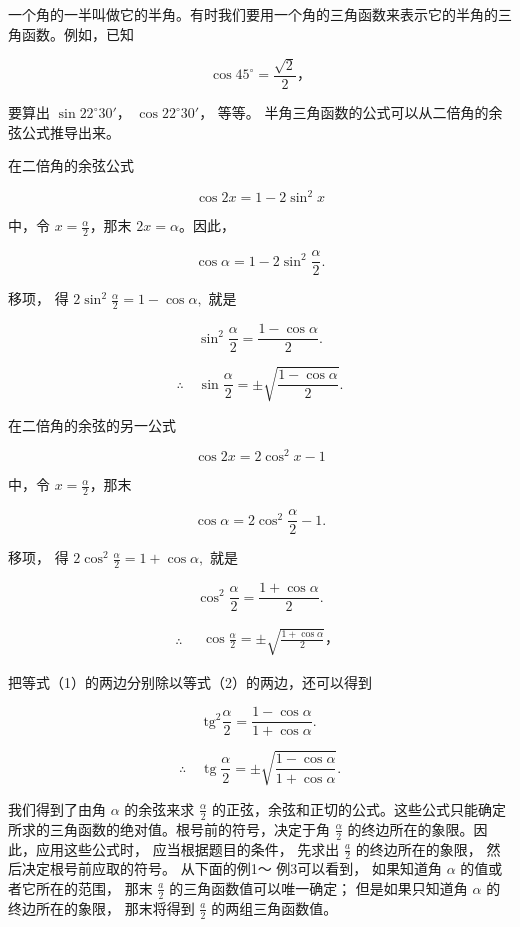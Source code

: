 一个角的一半叫做它的半角。有时我们要用一个角的三角函数来表示它的半角的三角函数。例如，已知

\[
\cos 45 ^{\circ} = \frac {\sqrt {2}}{2}\text{，}
\]

要算出 \(\sin 22^{\circ}30'\)， \(\cos 22^{\circ}30'\)， 等等。
半角三角函数的公式可以从二倍角的余弦公式推导出来。

在二倍角的余弦公式

\[
\cos 2 x = 1 - 2 \sin^ {2} x
\]

中，令 \(x = \frac{\alpha}{2}\)，那末 \(2x = \alpha\)。因此，

\[
\cos \alpha = 1 - 2 \sin^ {2} \frac {\alpha}{2}.
\]

移项， 得 \(2\sin^{2}\frac{\alpha}{2}=1-\cos\alpha,\) 就是

\[
\sin^ {2} \frac {\alpha}{2} = \frac {1 - \cos \alpha}{2}. \tag {1}
\]

\[
\therefore \quad \sin \frac {\alpha}{2} = \pm \sqrt {\frac {1 - \cos \alpha}{2}}.
\]

在二倍角的余弦的另一公式

\[
\cos 2 x = 2 \cos^ {2} x - 1
\]

中，令 \(x = \frac{\alpha}{2}\)，那末

\[
\cos \alpha = 2 \cos^ {2} \frac {\alpha}{2} - 1.
\]

移项， 得 \(2 \cos^{2} \frac{\alpha}{2} = 1 + \cos \alpha,\) 就是

\[
\cos^ {2} \frac {\alpha}{2} = \frac {1 + \cos \alpha}{2}. \tag {2}
\]

\[
\therefore \quad \boxed { \begin{array}{c} \cos \frac {\alpha}{2} = \pm \sqrt {\frac {1 + \cos \alpha}{2}}\text{，} \end{array} }
\]

把等式（1）的两边分别除以等式（2）的两边，还可以得到

\[
\mathrm{tg} ^ {2} \frac {\alpha}{2} = \frac {1 - \cos \alpha}{1 + \cos \alpha}.
\]

\[
\therefore \quad \operatorname{tg} \frac {\alpha}{2} = \pm \sqrt {\frac {1 - \cos \alpha}{1 + \cos \alpha}}.
\]

我们得到了由角 \(\alpha\) 的余弦来求 \(\frac{\alpha}{2}\)
的正弦，余弦和正切的公式。这些公式只能确定所求的三角函数的绝对值。根号前的符号，决定于角
\(\frac{\alpha}{2}\) 的终边所在的象限。因此，应用这些公式时，
应当根据题目的条件， 先求出 \(\frac{a}{2}\) 的终边所在的象限，
然后决定根号前应取的符号。 从下面的例1～ 例3可以看到，
如果知道角 \(\alpha\) 的值或者它所在的范围， 那末 \(\frac{a}{2}\)
的三角函数值可以唯一确定； 但是如果只知道角 \(\alpha\)
的终边所在的象限， 那末将得到 \(\frac{a}{2}\) 的两组三角函数值。

